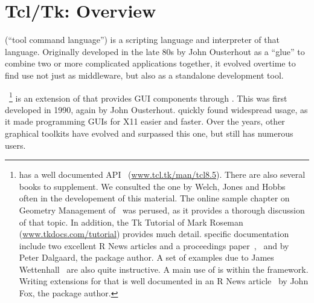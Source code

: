  
\newcommand{\Event}[1]{$<$#1$>$}
\newcommand{\VirtualEvent}[1]{$<<$#1$>>$}



\chapter{Tcl/Tk: Overview}
\label{sec:tcltk:overview}




\TCL\/ (``tool command language'') is a scripting language and
interpreter of that language.  Originally developed in the late 80s by
John Ousterhout as a ``glue'' to combine two or more complicated
applications together, it evolved overtime to find use not just as
middleware, but also as a standalone development tool.

\TK~\footnote{
  \Tk{} has a well documented API~\citep{TclTk:Api}
  (\url{www.tcl.tk/man/tcl8.5}).  There are also several books to
  supplement. We consulted the one by Welch, Jones and
  Hobbs~\citep{beedub} often in the developement of this material. The
  online sample chapter on Geometry Management of~\citep{Walsh} was
  perused, as it provides a thorough discussion of that topic. In
  addition, the Tk Tutorial of Mark Roseman~\citep{TclTk:Tutorial}
  (\url{www.tkdocs.com/tutorial}) provides much detail. \R{} specific
  documentation include two excellent R News articles and a
  proceedings
  paper~\citep{Rnews:Dalgaard:2001a},~\citep{Rnewse:Dalgaard:2002} and
  \citep{Dalgaard-DSC} by Peter Dalgaard, the package author. A set of
  examples due to James Wettenhall~\citep{Wettenhall} are also quite
  instructive. A main use of  is within the 
  framework. Writing extensions for that is well documented in an R
  News article~\citep{Rnews:Fox:2007} by John Fox, the package author.
} is an extension of \TCL\/ that provides GUI components through \TCL.
This was first developed in 1990, again by John Ousterhout. \TK\/
quickly found widespread usage, as it made programming GUIs for X11
easier and faster. Over the years, other graphical toolkits have
evolved and surpassed this one, but \TK\/ still has numerous users.

